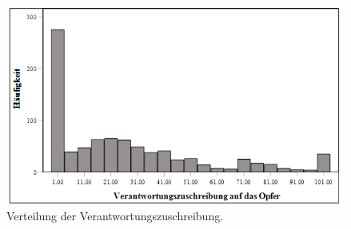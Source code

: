 \begin{figure}[htb]
    \centering
        \includegraphics[width=0.8\linewidth]{Histogramm - VicBlame.png}
        \caption[Histogramm Altersverteilung]{Verteilung der Verantwortungszuschreibung.}
        \label{Histogramm VicBlame}
\end{figure}

